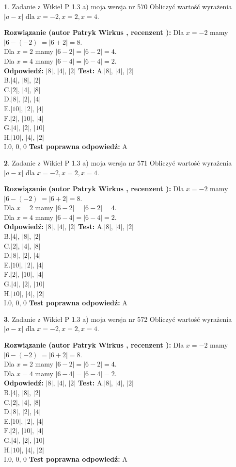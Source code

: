 \documentclass[12pt, a4paper]{article}
\theoremstyle{definition} %
\newtheorem{zad}{}
\newcommand{\zadStart}[1]{\begin{zad}#1\newline}
\newcommand{\zadStop}{\end{zad}}
\newcommand{\rozwStart}[2]{\noindent \textbf{Rozwiązanie (autor #1 , recenzent #2): }\newline}
\newcommand{\rozwStop}{\newline}
\newcommand{\odpStart}{\noindent \textbf{Odpowiedź:}\newline}
\newcommand{\odpStop}{\newline}
\newcommand{\testStart}{\noindent \textbf{Test:}\newline}
\newcommand{\testStop}{\newline}
\newcommand{\kluczStart}{\noindent \textbf{Test poprawna odpowiedź:}\newline}
\newcommand{\kluczStop}{\newline}
\begin{document}
\zadStart{Zadanie z Wikieł P 1.3 a) moja wersja nr 570}
Obliczyć wartość wyrażenia $|a - x|$ dla $x=-2,x=2,x=4$.
\zadStop
\rozwStart{Patryk Wirkus}{}
Dla $x = -2$ mamy $|6 - (-2)| = |6 + 2| = 8$.\\
Dla $x = 2$ mamy $|6 - 2| = |6 - 2| = 4$.\\
Dla $x = 4$ mamy $|6 - 4| = |6 - 4| = 2$.\\
\rozwStop
\odpStart
$|8|$, $|4|$, $|2|$
\odpStop
\testStart
A.$|8|$, $|4|$, $|2|$\\
B.$|4|$, $|8|$, $|2|$\\
C.$|2|$, $|4|$, $|8|$\\
D.$|8|$, $|2|$, $|4|$\\
E.$|10|$, $|2|$, $|4|$\\
F.$|2|$, $|10|$, $|4|$\\
G.$|4|$, $|2|$, $|10|$\\
H.$|10|$, $|4|$, $|2|$\\
I.$0$, $0$, $0$
\testStop
\kluczStart
A
\kluczStop



\zadStart{Zadanie z Wikieł P 1.3 a) moja wersja nr 571}
Obliczyć wartość wyrażenia $|a - x|$ dla $x=-2,x=2,x=4$.
\zadStop
\rozwStart{Patryk Wirkus}{}
Dla $x = -2$ mamy $|6 - (-2)| = |6 + 2| = 8$.\\
Dla $x = 2$ mamy $|6 - 2| = |6 - 2| = 4$.\\
Dla $x = 4$ mamy $|6 - 4| = |6 - 4| = 2$.\\
\rozwStop
\odpStart
$|8|$, $|4|$, $|2|$
\odpStop
\testStart
A.$|8|$, $|4|$, $|2|$\\
B.$|4|$, $|8|$, $|2|$\\
C.$|2|$, $|4|$, $|8|$\\
D.$|8|$, $|2|$, $|4|$\\
E.$|10|$, $|2|$, $|4|$\\
F.$|2|$, $|10|$, $|4|$\\
G.$|4|$, $|2|$, $|10|$\\
H.$|10|$, $|4|$, $|2|$\\
I.$0$, $0$, $0$
\testStop
\kluczStart
A
\kluczStop



\zadStart{Zadanie z Wikieł P 1.3 a) moja wersja nr 572}
Obliczyć wartość wyrażenia $|a - x|$ dla $x=-2,x=2,x=4$.
\zadStop
\rozwStart{Patryk Wirkus}{}
Dla $x = -2$ mamy $|6 - (-2)| = |6 + 2| = 8$.\\
Dla $x = 2$ mamy $|6 - 2| = |6 - 2| = 4$.\\
Dla $x = 4$ mamy $|6 - 4| = |6 - 4| = 2$.\\
\rozwStop
\odpStart
$|8|$, $|4|$, $|2|$
\odpStop
\testStart
A.$|8|$, $|4|$, $|2|$\\
B.$|4|$, $|8|$, $|2|$\\
C.$|2|$, $|4|$, $|8|$\\
D.$|8|$, $|2|$, $|4|$\\
E.$|10|$, $|2|$, $|4|$\\
F.$|2|$, $|10|$, $|4|$\\
G.$|4|$, $|2|$, $|10|$\\
H.$|10|$, $|4|$, $|2|$\\
I.$0$, $0$, $0$
\testStop
\kluczStart
A
\kluczStop
\end{document}
